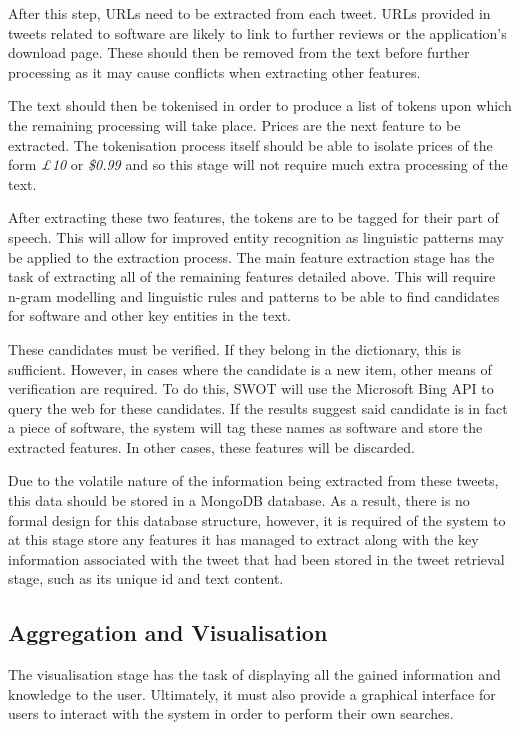 After this step, URLs need to be extracted from each tweet. URLs provided in tweets related to software are likely to link to further reviews or the application's download page. These should then be removed from the text before further processing as it may cause conflicts when extracting other features.

The text should then be tokenised in order to produce a list of tokens upon which the remaining processing will take place. Prices are the next feature to be extracted. The tokenisation process itself should be able to isolate prices of the form \emph{£10} or \emph{\$0.99} and so this stage will not require much extra processing of the text.

After extracting these two features, the tokens are to be tagged for their part of speech. This will allow for improved entity recognition as linguistic patterns may be applied to the extraction process. The main feature extraction stage has the task of extracting all of the remaining features detailed above. This will require n-gram modelling and linguistic rules and patterns to be able to find candidates for software and other key entities in the text.

These candidates must be verified. If they belong in the dictionary, this is sufficient. However, in cases where the candidate is a new item, other means of verification are required. To do this, SWOT will use the Microsoft Bing API to query the web for these candidates. If the results suggest said candidate is in fact a piece of software, the system will tag these names as software and store the extracted features. In other cases, these features will be discarded.

Due to the volatile nature of the information being extracted from these tweets, this data should be stored in a MongoDB database. As a result, there is no formal design for this database structure, however, it is required of the system to at this stage store any features it has managed to extract along with the key information associated with the tweet that had been stored in the tweet retrieval stage, such as its unique id and text content.

\subsection{Aggregation and Visualisation}
\label{sec:arc3}
The visualisation stage has the task of displaying all the gained information and knowledge to the user. Ultimately, it must also provide a graphical interface for users to interact with the system in order to perform their own searches.

